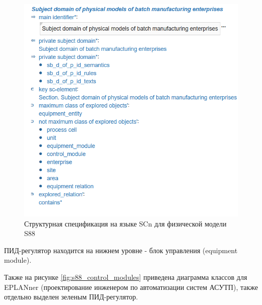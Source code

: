 \begin{figure}[H]
    \centering
    \includegraphics[width=\textwidth,height=\textheight,keepaspectratio]{images/chapter_4/s88_physical_result_ontology.png}
    \caption{Структурная спецификация на языке SCn для физической модели S88}
    \label{fig:s88_physical_result_ontology}
\end{figure}

ПИД-регулятор находится на нижнем уровне - блок управления (equipment module).

Также на рисунке \ref{fig:s88_control_modules} приведена диаграмма классов для EPLANner (проектирование инженером по автоматизации систем АСУТП), также отдельно выделен зеленым ПИД-регулятор.

